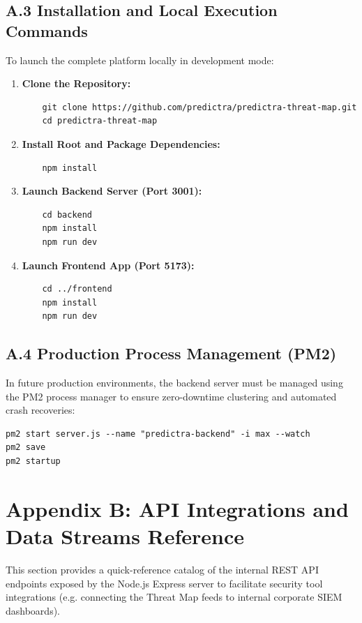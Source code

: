 \subsection*{A.3 Installation and Local Execution Commands}
To launch the complete platform locally in development mode:
\begin{enumerate}
    \item \textbf{Clone the Repository:}
    \begin{verbatim}
    git clone https://github.com/predictra/predictra-threat-map.git
    cd predictra-threat-map
    \end{verbatim}
    \item \textbf{Install Root and Package Dependencies:}
    \begin{verbatim}
    npm install
    \end{verbatim}
    \item \textbf{Launch Backend Server (Port 3001):}
    \begin{verbatim}
    cd backend
    npm install
    npm run dev
    \end{verbatim}
    \item \textbf{Launch Frontend App (Port 5173):}
    \begin{verbatim}
    cd ../frontend
    npm install
    npm run dev
    \end{verbatim}
\end{enumerate}

\subsection*{A.4 Production Process Management (PM2)}
In future production environments, the backend server must be managed using the PM2 process manager to ensure zero-downtime clustering and automated crash recoveries:
\begin{verbatim}
pm2 start server.js --name "predictra-backend" -i max --watch
pm2 save
pm2 startup
\end{verbatim}

\section*{Appendix B: API Integrations and Data Streams Reference}
This section provides a quick-reference catalog of the internal REST API endpoints exposed by the Node.js Express server to facilitate security tool integrations (e.g. connecting the Threat Map feeds to internal corporate SIEM dashboards).

